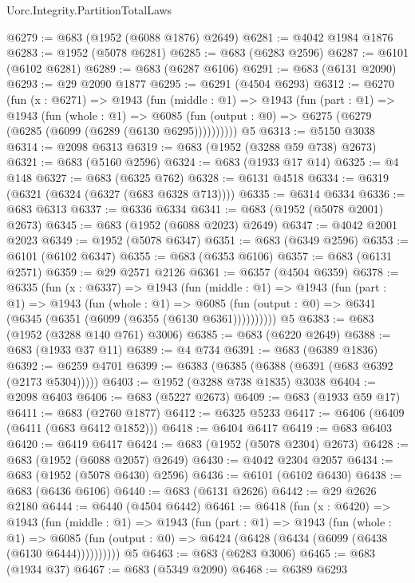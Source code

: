 \begin{lexlean}{Uorc.Integrity.PartitionTotalLaws}
\begin{coremodule}
@6279 := @683 (@1952 (@6088 @1876) @2649)
@6281 := @4042 @1984 @1876
@6283 := @1952 (@5078 @6281)
@6285 := @683 (@6283 @2596)
@6287 := @6101 (@6102 @6281)
@6289 := @683 (@6287 @6106)
@6291 := @683 (@6131 @2090)
@6293 := @29 @2090 @1877
@6295 := @6291 (@4504 @6293)
@6312 := @6270
    (fun (x : @6271) =>
    @1943
      (fun (middle : @1) =>
      @1943
        (fun (part : @1) =>
        @1943
          (fun (whole : @1) =>
          @6085 (fun (output : @0) => @6275 (@6279 (@6285 (@6099 (@6289 (@6130 @6295))))))))))
    @5
@6313 := @5150 @3038
@6314 := @2098 @6313
@6319 := @683 (@1952 (@3288 @59 @738) @2673)
@6321 := @683 (@5160 @2596)
@6324 := @683 (@1933 @17 @14)
@6325 := @4 @148
@6327 := @683 (@6325 @762)
@6328 := @6131 @4518
@6334 := @6319 (@6321 (@6324 (@6327 (@683 @6328 @713))))
@6335 := @6314 @6334
@6336 := @683 @6313
@6337 := @6336 @6334
@6341 := @683 (@1952 (@5078 @2001) @2673)
@6345 := @683 (@1952 (@6088 @2023) @2649)
@6347 := @4042 @2001 @2023
@6349 := @1952 (@5078 @6347)
@6351 := @683 (@6349 @2596)
@6353 := @6101 (@6102 @6347)
@6355 := @683 (@6353 @6106)
@6357 := @683 (@6131 @2571)
@6359 := @29 @2571 @2126
@6361 := @6357 (@4504 @6359)
@6378 := @6335
    (fun (x : @6337) =>
    @1943
      (fun (middle : @1) =>
      @1943
        (fun (part : @1) =>
        @1943
          (fun (whole : @1) =>
          @6085 (fun (output : @0) => @6341 (@6345 (@6351 (@6099 (@6355 (@6130 @6361))))))))))
    @5
@6383 := @683 (@1952 (@3288 @140 @761) @3006)
@6385 := @683 (@6220 @2649)
@6388 := @683 (@1933 @37 @11)
@6389 := @4 @734
@6391 := @683 (@6389 @1836)
@6392 := @6259 @4701
@6399 := @6383 (@6385 (@6388 (@6391 (@683 @6392 (@2173 @5304)))))
@6403 := @1952 (@3288 @738 @1835) @3038
@6404 := @2098 @6403
@6406 := @683 (@5227 @2673)
@6409 := @683 (@1933 @59 @17)
@6411 := @683 (@2760 @1877)
@6412 := @6325 @5233
@6417 := @6406 (@6409 (@6411 (@683 @6412 @1852)))
@6418 := @6404 @6417
@6419 := @683 @6403
@6420 := @6419 @6417
@6424 := @683 (@1952 (@5078 @2304) @2673)
@6428 := @683 (@1952 (@6088 @2057) @2649)
@6430 := @4042 @2304 @2057
@6434 := @683 (@1952 (@5078 @6430) @2596)
@6436 := @6101 (@6102 @6430)
@6438 := @683 (@6436 @6106)
@6440 := @683 (@6131 @2626)
@6442 := @29 @2626 @2180
@6444 := @6440 (@4504 @6442)
@6461 := @6418
    (fun (x : @6420) =>
    @1943
      (fun (middle : @1) =>
      @1943
        (fun (part : @1) =>
        @1943
          (fun (whole : @1) =>
          @6085 (fun (output : @0) => @6424 (@6428 (@6434 (@6099 (@6438 (@6130 @6444))))))))))
    @5
@6463 := @683 (@6283 @3006)
@6465 := @683 (@1934 @37)
@6467 := @683 (@5349 @2090)
@6468 := @6389 @6293

\end{coremodule}
\end{lexlean}
